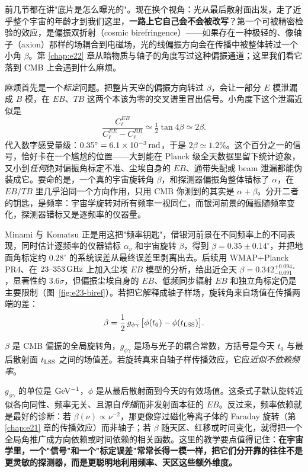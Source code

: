 前几节都在讲"底片是怎么曝光的"。现在换个视角：光从最后散射面出发，走了近乎整个宇宙的年龄才到我们这里，\textbf{一路上它自己会不会被改写}？第一个可被精密检验的效应，是偏振双折射（cosmic birefringence）——如果存在一种极轻的、像轴子（axion）那样的场耦合到电磁场，光的线偏振方向会在传播中被整体转过一个小角 \(\beta\)。第 \ref{chap:e22} 章从暗物质与轴子的角度写过这种偏振通道；这里我们看它落到 CMB 上会遇到什么麻烦。

麻烦首先是一个\emph{标定}问题。把整片天空的偏振方向转过 \(\beta\)，会让一部分 \(E\) 模泄漏成 \(B\) 模，在 \(EB\)、\(TB\) 这两个本该为零的交叉谱里冒出信号。小角度下这个泄漏近似是
\[
  \frac{C_\ell^{EB}}{C_\ell^{EE}-C_\ell^{BB}}\simeq \tfrac12\tan 4\beta\simeq 2\beta .
\]
代入数字感受量级：\(0.35^\circ=6.1\times10^{-3}\,{\rm rad}\)，于是 \(2\beta\simeq1.2\%\)。这个百分之一的信号，恰好卡在一个尴尬的位置——大到能在 Planck 级全天数据里留下统计迹象，又小到\emph{任何}绝对偏振角标定不准、尘埃自身的 \(EB\)、通带失配或 beam 泄漏都能伪装成它。要命的是，一个真的宇宙旋转角 \(\beta\)，和探测器偏振角整体错标了 \(\alpha\)，在 \(EB/TB\) 里几乎沿同一个方向作用，只用 CMB 你测到的其实是 \(\alpha+\beta\)。分开二者的钥匙，是频率：宇宙学旋转对所有频率一视同仁，而银河前景的偏振随频率变化，探测器错标又是逐频率的仪器量。

Minami 与 Komatsu 正是用这把"频率钥匙"，借银河前景在不同频率上的不同表现，同时估计逐频率的仪器错标 \(\alpha_\nu\) 和宇宙旋转 \(\beta\)，得到 \(\beta=0.35\pm0.14^\circ\)，并把地面角标定约 \(0.28^\circ\) 的系统误差从最终误差里剥离出去。后续用 WMAP+Planck PR4、在 \(23\text{--}353\,{\rm GHz}\) 上加入尘埃 \(EB\) 模型的分析，给出近全天 \(\beta=0.342^{+0.094}_{-0.091}{}^\circ\)，显著性约 \(3.6\sigma\)，但偏振尘埃自身的 \(EB\)、低频同步辐射 \(EB\) 和独立角标定仍是主要限制（图~\ref{fig:e23-biref}）\citep{2020PhRvL.125v1301M,2022PhRvD.106f3503E,2022PhRvL.128i1302D,2022NatRP...4..452K}。若把它解释成轴子样场，旋转角来自场值在传播两端的差：
\begin{equation}
  \beta=\frac12\,g_{\phi\gamma}\,\bigl[\phi(t_0)-\phi(t_{\rm LSS})\bigr] .
  \label{eq:e23-axion-birefringence}
\end{equation}
\begin{formulaexplain}
\(\beta\) 是 CMB 偏振的全局旋转角，\(g_{\phi\gamma}\) 是场与光子的耦合常数，方括号是今天 \(t_0\) 与最后散射面 \(t_{\rm LSS}\) 之间的场值差。若旋转真来自轴子样传播效应，它应\emph{近似不依赖频率}。
\end{formulaexplain}
\(g_{\phi\gamma}\) 的单位是 \({\rm GeV^{-1}}\)，\(\phi\) 是从最后散射面到今天的有效场值。这条式子默认旋转近似各向同性、频率无关、且源自\emph{传播}而非发射面本征的 \(EB\)。反过来，频率依赖就是最好的诊断：若 \(\beta(\nu)\propto\nu^{-2}\)，那更像穿过磁化等离子体的 Faraday 旋转（第 \ref{chap:e21} 章的传播效应）而非轴子；若 \(\beta\) 随天区、红移或时间变化，就得把一个全局角推广成方向依赖或时间依赖的相关函数。这里的教学要点值得记住：\textbf{在宇宙学里，一个"信号"和一个"标定误差"常常长得一模一样，把它们分开靠的往往不是更灵敏的探测器，而是更聪明地利用频率、天区这些额外维度。}

